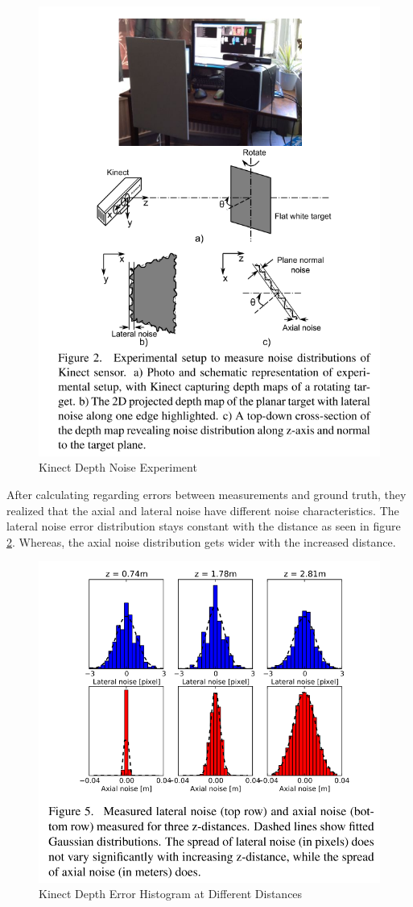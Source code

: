 \documentclass[a4paper]{report}
\numberwithin{figure}{section}
\begin{document}
\begin{figure}[H]
	\centering
  \includegraphics[width=0.7\linewidth,natwidth=640,natheight=640]
  {fig/ref_imgs/kinect_noise_experiment.png}
  \caption{Kinect Depth Noise Experiment}
	\label{fig:kinect_noise_experiment}
\end{figure}

After calculating regarding errors between measurements and ground truth, 
they realized that the axial and lateral noise have different noise 
characteristics. The lateral noise error distribution stays constant with 
the distance as seen in figure \ref{fig:kinect_noise_hist}. Whereas, 
the axial noise distribution gets wider with the 
increased distance.


\begin{figure}[H]
	\centering
  \includegraphics[width=0.7\linewidth,natwidth=640,natheight=640]
  {fig/ref_imgs/kinect_noise_hist.png}
  \caption{Kinect Depth Error Histogram at Different Distances}
	\label{fig:kinect_noise_hist}
\end{figure}
\end{document}
